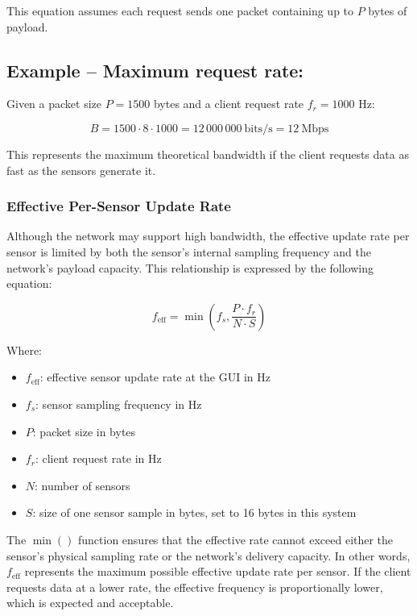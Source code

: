 This equation assumes each request sends one packet containing up to $P$ bytes of payload.

\subsection*{Example – Maximum request rate:}
Given a packet size $P = 1500$ bytes and a client request rate $f_r = 1000$ Hz:

\begin{equation}
B = 1500 \cdot 8 \cdot 1000 = 12\,000\,000~\text{bits/s} = 12~\text{Mbps}
\end{equation}


This represents the maximum theoretical bandwidth if the client requests data as fast as the sensors generate it.


\subsubsection{Effective Per-Sensor Update Rate}

Although the network may support high bandwidth, the effective update rate per sensor is limited by both the sensor's internal sampling frequency and the network's payload capacity. This relationship is expressed by the following equation:

\begin{equation}
f_{\text{eff}} = \min \left( f_s, \frac{P \cdot f_r}{N \cdot S} \right)
\end{equation}


Where:
\begin{itemize}
    \item[] $f_{\text{eff}}$: effective sensor update rate at the GUI in Hz
    \item[] $f_s$: sensor sampling frequency in Hz
    \item[] $P$: packet size in bytes
    \item[] $f_r$: client request rate in Hz
    \item[] $N$: number of sensors
    \item[] $S$: size of one sensor sample in bytes, set to 16 bytes in this system
\end{itemize}


The $\min()$ function ensures that the effective rate cannot exceed either the sensor's physical sampling rate or the network's delivery capacity.
In other words, $f_{\text{eff}}$ represents the maximum possible effective update rate per sensor. 
If the client requests data at a lower rate, the effective frequency is proportionally 
lower, which is expected and acceptable.



